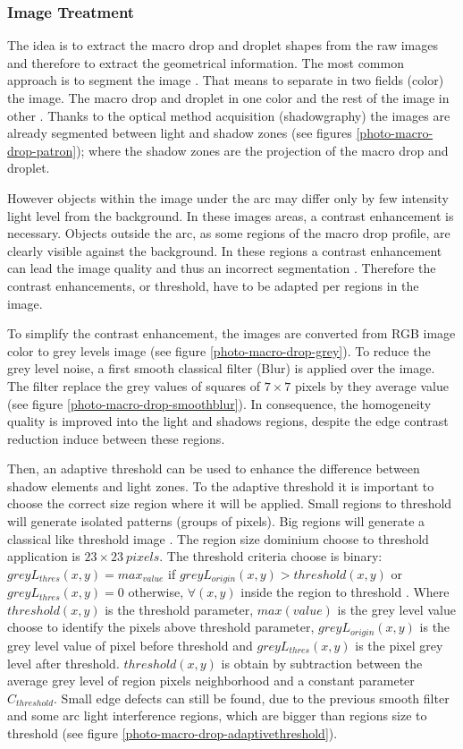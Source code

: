 \documentclass[12pt]{iopart}
\begin{document}
  
\subsubsection{ Image Treatment}
\label{ image_treatment}

The idea is to extract the macro drop and droplet shapes 
from the raw images and therefore to extract the geometrical information.
 The most common approach is to segment the image \cite{WANG}. 
That means to separate in two fields (color) the image. The macro drop and droplet in one color and
the rest of the image in other \cite{COCQUEREZ}. Thanks to the optical method acquisition
 (shadowgraphy) the images are already segmented between
light and shadow zones (see figures \ref{photo-macro-drop-patron});
 where the shadow zones are the projection of the macro drop and droplet.

However objects within the image under the arc may differ only by few intensity light level
from the background. In these images areas, a contrast enhancement is necessary. 
Objects outside the arc, as  some regions of the macro drop profile,
 are clearly visible against the background. In these regions a contrast enhancement 
can lead the image quality and thus an incorrect segmentation \cite{NORDBRUCH}.
 Therefore the contrast enhancements, or threshold, have to be adapted per regions in the image.  

To simplify the contrast enhancement, the images are converted from RGB image color 
to grey levels image (see figure \ref{photo-macro-drop-grey}). To 
reduce the grey level noise, a first smooth classical filter 
(Blur) is applied over the image. The filter replace
the grey values of squares of $7\times 7$ 
pixels by they average value (see figure \ref{photo-macro-drop-smoothblur}). 
In consequence, the homogeneity quality is improved into the light and 
shadows regions, despite the edge contrast reduction induce between these regions. 

Then, an  adaptive threshold can be used to enhance the difference
between shadow elements and light zones. To the adaptive threshold it is important 
to choose the correct size region where it will be applied. Small regions to threshold
will generate isolated patterns (groups of pixels). Big regions will generate
a classical like threshold image \cite{SABER}. The region size dominium choose
to threshold application is $23\times 23\ pixels$. The threshold criteria 
choose is binary: $greyL_{thres}(x,y) = max_{value}$ if $greyL_{origin}(x,y) >  threshold(x,y)$
or $greyL_{thres}(x,y) = 0$ otherwise, $\forall (x,y)$ inside the region
to threshold \cite{OPENCV}. Where $threshold(x,y)$ is the threshold parameter,
 $max(value)$ is the grey level value choose to identify the pixels above
threshold parameter, $greyL_{origin}(x,y)$ is the grey level value of pixel
 before threshold and $greyL_{thres}(x,y)$ is the pixel grey level after threshold.
$threshold(x,y)$ is obtain by subtraction between the average grey level of region
 pixels neighborhood and a constant parameter $C_{threshold}$.  
Small edge defects can still be found, due to the previous smooth filter and some arc 
light interference regions, which are bigger than regions size to
threshold (see figure \ref{photo-macro-drop-adaptivethreshold}).  
\end{document}
